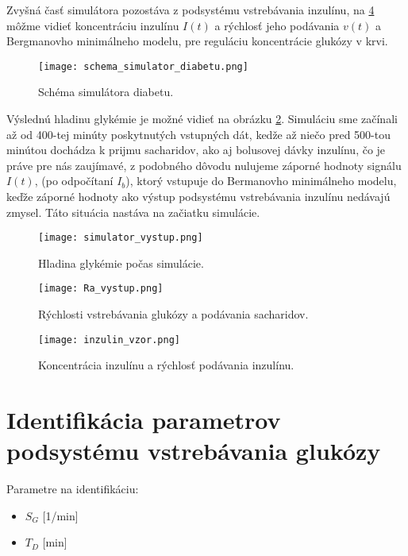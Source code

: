 \documentclass[11pt]{article} %
\begin{document}

Zvyšná časť simulátora pozostáva z podsystému vstrebávania inzulínu, 
na \ref{fig:vystup_inzulin} môžme vidieť koncentráciu inzulínu $I(t)$ a rýchlosť jeho podávania $v(t)$
a Bergmanovho minimálneho modelu, pre reguláciu koncentrácie glukózy v krvi.

\begin{figure}[!htb]
	\centering
	\texttt{[image: schema\_simulator\_diabetu.png]} 
	\caption{Schéma simulátora diabetu.}
	\label{fig:cely_simulator}
\end{figure}

\newpage

Výslednú hladinu glykémie je možné vidieť na obrázku \ref{fig:simulator_vystup}. Simuláciu sme začínali až od 400-tej minúty poskytnutých vstupných dát, kedže až niečo pred 500-tou minútou dochádza k prijmu sacharidov, ako aj bolusovej dávky inzulínu, čo je práve pre nás zaujímavé, z podobného dôvodu nulujeme záporné hodnoty signálu $I(t)$, (po odpočítaní $I_b$), ktorý vstupuje do Bermanovho minimálneho modelu, keďže záporné hodnoty ako výstup podsystému vstrebávania inzulínu nedávajú zmysel. Táto situácia nastáva na začiatku simulácie.  

\begin{figure}[!htb]
	\centering
	\texttt{[image: simulator\_vystup.png]} 
	\caption{Hladina glykémie počas simulácie.}
	\label{fig:simulator_vystup}
\end{figure}

\begin{figure}[h]
	\centering
	\texttt{[image: Ra\_vystup.png]} 
	\caption{Rýchlosti vstrebávania glukózy a podávania sacharidov.}
	\label{fig:vystup_glukozy}
\end{figure}

\begin{figure}[h]
	\centering
	\texttt{[image: inzulin\_vzor.png]} 
	\caption{Koncentrácia inzulínu a rýchlosť podávania inzulínu.}
	\label{fig:vystup_inzulin}
\end{figure}


\newpage

\section{Identifikácia parametrov podsystému vstrebávania glukózy}
Parametre na identifikáciu:
\begin{itemize}
\item $S_G$ [1/min]
\item $T_D$ [min]
\end{itemize}
\end{document}
